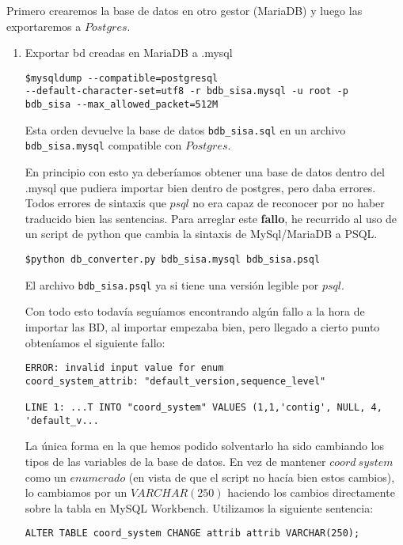 \documentclass[12pt,a4paper]{article}
\begin{document}
Primero crearemos la base de datos en otro gestor (MariaDB) y luego las exportaremos a $Postgres$.

\begin{enumerate}
\item Exportar bd creadas en MariaDB a .mysql

\begin{verbatim} 
$mysqldump --compatible=postgresql 
--default-character-set=utf8 -r bdb_sisa.mysql -u root -p 
bdb_sisa --max_allowed_packet=512M
\end{verbatim}

Esta orden devuelve la base de datos \verb|bdb_sisa.sql| en un archivo \verb|bdb_sisa.mysql| compatible con $Postgres$.

En principio con esto ya deberíamos obtener una base de datos dentro del .mysql que pudiera importar bien dentro de postgres, pero daba errores. Todos errores de sintaxis que $psql$ no era capaz de reconocer por no haber traducido bien las sentencias.
Para arreglar este \textbf{fallo}, he recurrido al uso de un script de python que cambia la sintaxis de MySql/MariaDB a PSQL.

\begin{verbatim} 
$python db_converter.py bdb_sisa.mysql bdb_sisa.psql 
\end{verbatim} \cite{cDB11}

El archivo \verb|bdb_sisa.psql| ya si tiene una versión legible por $psql$.

Con todo esto todavía seguíamos encontrando algún fallo a la hora de importar las BD, al importar empezaba bien, pero llegado a cierto punto obteníamos el siguiente fallo:

\begin{verbatim} 
ERROR: invalid input value for enum
coord_system_attrib: "default_version,sequence_level"

LINE 1: ...T INTO "coord_system" VALUES (1,1,'contig', NULL, 4, 'default_v...
\end{verbatim}

\newpage

La única forma en la que hemos podido solventarlo ha sido cambiando los tipos de las variables de la base de datos. En vez de mantener $coord \ system$ como un $enumerado$ (en vista de que el script no hacía bien estos cambios), lo cambiamos por un $VARCHAR(250)$ haciendo los cambios directamente sobre la tabla en MySQL Workbench. Utilizamos la siguiente sentencia:

\begin{verbatim} 
ALTER TABLE coord_system CHANGE attrib attrib VARCHAR(250);
\end{verbatim}


\end{enumerate}
\end{document}
